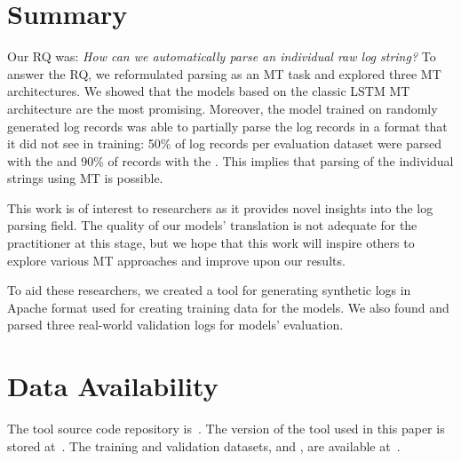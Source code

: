 \documentclass{article}
\begin{document}
\section{Summary} \label{sec:summary}
Our RQ was: \textit{How can we automatically parse an individual raw log string?} To answer the RQ, we reformulated parsing as an MT task and explored three MT architectures. We showed that the models based on the classic LSTM MT architecture are the most promising. 
Moreover, the model trained on randomly generated log records was able to partially parse the log records in a format that it did not see in training: 50\% of log records per evaluation dataset were parsed with the  and 90\% of records with the .  This implies that parsing of the individual strings using MT is possible.

This work is of interest to researchers as it provides novel insights into the log parsing field. The quality of our models’ translation is not adequate for the practitioner at this stage, but we hope that this work will inspire others to explore various MT approaches and improve upon our results. 

To aid these researchers, we created a tool for generating synthetic logs in Apache format used for creating training data for the models. We also found and parsed three real-world validation logs for models’ evaluation. 

\section{Data Availability}\label{sec:access}
The tool source code repository is~\cite{dat:github}. The version of the tool used in this paper is stored at~\cite{code:zenodo}. The training and validation datasets,  and , are available at~\cite{dat:zenodo}.

 
\end{document}

